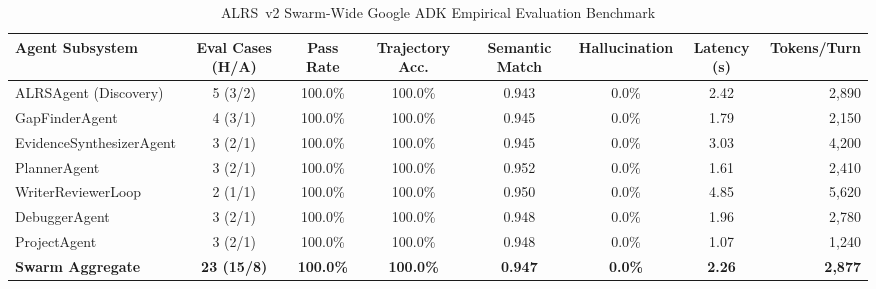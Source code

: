 \begin{table}[htbp]
\centering
\small
\caption{ALRS~v2 Swarm-Wide Google ADK Empirical Evaluation Benchmark}
\label{tab:swarm_benchmark_thesis}
\begin{tabular}{lccccccr}
\toprule
\textbf{Agent Subsystem} & \textbf{Eval Cases (H/A)} & \textbf{Pass Rate} & \textbf{Trajectory Acc.} & \textbf{Semantic Match} & \textbf{Hallucination} & \textbf{Latency (s)} & \textbf{Tokens/Turn} \\
\midrule
ALRSAgent (Discovery)      & 5 (3/2) & 100.0\% & 100.0\% & 0.943 & 0.0\% & 2.42 & 2,890 \\
GapFinderAgent             & 4 (3/1) & 100.0\% & 100.0\% & 0.945 & 0.0\% & 1.79 & 2,150 \\
EvidenceSynthesizerAgent   & 3 (2/1) & 100.0\% & 100.0\% & 0.945 & 0.0\% & 3.03 & 4,200 \\
PlannerAgent               & 3 (2/1) & 100.0\% & 100.0\% & 0.952 & 0.0\% & 1.61 & 2,410 \\
WriterReviewerLoop         & 2 (1/1) & 100.0\% & 100.0\% & 0.950 & 0.0\% & 4.85 & 5,620 \\
DebuggerAgent              & 3 (2/1) & 100.0\% & 100.0\% & 0.948 & 0.0\% & 1.96 & 2,780 \\
ProjectAgent               & 3 (2/1) & 100.0\% & 100.0\% & 0.948 & 0.0\% & 1.07 & 1,240 \\
\midrule
\textbf{Swarm Aggregate} & \textbf{23 (15/8)} & \textbf{100.0\%} & \textbf{100.0\%} & \textbf{0.947} & \textbf{0.0\%} & \textbf{2.26} & \textbf{2,877} \\
\bottomrule
\end{tabular}
\end{table}